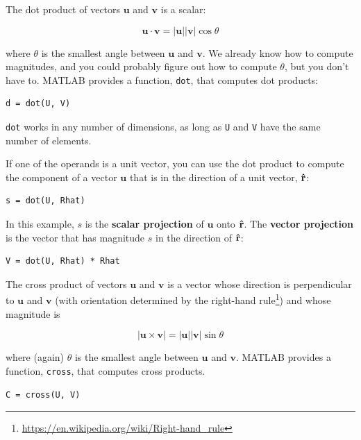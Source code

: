 \documentclass[
]{book}
\renewcommand{\vec}[1]{\bm{\mathbf{#1}}}
\newcommand{\uveci}{{\bm{\hat{\textnormal{\bfseries\i}}}}}
\newcommand{\uvecj}{{\bm{\hat{\textnormal{\bfseries\j}}}}}
\newcommand{\uvec}[1]{%
    \ifthenelse{\equal{#1}{i}}%
        {\uveci}{%
    \ifthenelse{\equal{#1}{j}}%
        {\uvecj}{%
    {\bm{\hat{\mathbf{#1}}}}%
}}}
\newcommand{\norm}[1]{\lvert #1 \rvert}
\begin{document}
The dot product of vectors $\vec{u}$ and $\vec{v}$ is a scalar:

\begin{equation}
    \vec{u} \cdot \vec{v} = \norm{\vec{u}} \norm{\vec{v}} \cos \theta
\end{equation}

where $\theta$ is the smallest angle between $\vec{u}$ and
$\vec{v}$. We already know how to compute magnitudes, and you could
probably figure out how to compute $\theta$, but you don't have to.
MATLAB provides a function, {\tt dot}, that computes dot products:

\begin{verbatim}
d = dot(U, V)
\end{verbatim}

{\tt dot} works in any number of dimensions, as long as {\tt U}
and {\tt V} have the same number of elements.

If one of the operands is a unit vector, you can use the dot
product to compute the component of a vector $\vec{u}$ that is in
the direction of a unit vector, $\uvec{r}$:

\begin{verbatim}
s = dot(U, Rhat)
\end{verbatim}

In this example, $s$ is the {\bf scalar projection} of $\vec{u}$
onto $\uvec{r}$.  The {\bf vector projection} is the vector
that has magnitude $s$ in the direction of $\uvec{r}$:

\begin{verbatim}
V = dot(U, Rhat) * Rhat
\end{verbatim}

The cross product of vectors $\vec{u}$ and $\vec{v}$ is a vector whose
direction is perpendicular to $\vec{u}$ and $\vec{v}$
(with orientation determined by the right-hand
rule\footnote{\url{https://en.wikipedia.org/wiki/Right-hand_rule}})
and whose magnitude is

\begin{equation}
    \norm{\vec{u} \times \vec{v}} = \norm{\vec{u}} \norm{\vec{v}} \sin \theta
\end{equation}

where (again) $\theta$ is the smallest angle between $\vec{u}$ and
$\vec{v}$. MATLAB provides a function, {\tt cross}, that computes cross
products.

\begin{verbatim}
C = cross(U, V)
\end{verbatim}
\end{document}
